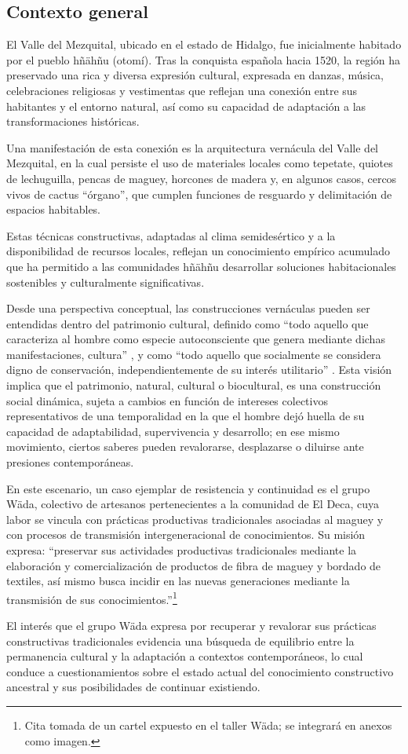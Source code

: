 \subsection{Contexto general}

El Valle del Mezquital, ubicado en el estado de Hidalgo, fue inicialmente habitado por el pueblo hñähñu (otomí). Tras la conquista española hacia 1520, la región ha preservado una rica y diversa expresión cultural, expresada en danzas, música, celebraciones religiosas y vestimentas que reflejan una conexión entre sus habitantes y el entorno natural, así como su capacidad de adaptación a las transformaciones históricas.

Una manifestación de esta conexión es la arquitectura vernácula del Valle del Mezquital, en la cual persiste el uso de materiales locales como tepetate, quiotes de lechuguilla, pencas de maguey, horcones de madera y, en algunos casos, cercos vivos de cactus \enquote{órgano}, que cumplen funciones de resguardo y delimitación de espacios habitables.

Estas técnicas constructivas, adaptadas al clima semidesértico y a la disponibilidad de recursos locales, reflejan un conocimiento empírico acumulado que ha permitido a las comunidades hñähñu desarrollar soluciones habitacionales sostenibles y culturalmente significativas.

Desde una perspectiva conceptual, las construcciones vernáculas pueden ser entendidas dentro del patrimonio cultural, definido como \enquote{todo aquello que caracteriza al hombre como especie autoconsciente que genera mediante dichas manifestaciones, cultura} \citep{dominguez2004pautas}, y como \enquote{todo aquello que socialmente se considera digno de conservación, independientemente de su interés utilitario} \citep[p. 63]{prats1998concepto}. Esta visión implica que el patrimonio, natural, cultural o biocultural, es una construcción social dinámica, sujeta a cambios en función de intereses colectivos representativos de una temporalidad en la que el hombre dejó huella de su capacidad de adaptabilidad, supervivencia y desarrollo; en ese mismo movimiento, ciertos saberes pueden revalorarse, desplazarse o diluirse ante presiones contemporáneas.

En este escenario, un caso ejemplar de resistencia y continuidad es el grupo Wäda, colectivo de artesanos pertenecientes a la comunidad de El Deca, cuya labor se vincula con prácticas productivas tradicionales asociadas al maguey y con procesos de transmisión intergeneracional de conocimientos. Su misión expresa: \enquote{preservar sus actividades productivas tradicionales mediante la elaboración y comercialización de productos de fibra de maguey y bordado de textiles, así mismo busca incidir en las nuevas generaciones mediante la transmisión de sus conocimientos.}\footnote{Cita tomada de un cartel expuesto en el taller Wäda; se integrará en anexos como imagen.}

El interés que el grupo Wäda expresa por recuperar y revalorar sus prácticas constructivas tradicionales evidencia una búsqueda de equilibrio entre la permanencia cultural y la adaptación a contextos contemporáneos, lo cual conduce a cuestionamientos sobre el estado actual del conocimiento constructivo ancestral y sus posibilidades de continuar existiendo.
